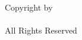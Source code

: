 
\begin{singlespacing}
	\thispagestyle{empty}
	\vspace*{10\baselineskip}
	\begin{center}
		\makeatletter
		{\textcopyright} Copyright by \@author\\
		\@submitdate \\
		All Rights Reserved
		\makeatother
	\end{center}
\end{singlespacing}

\newpage
